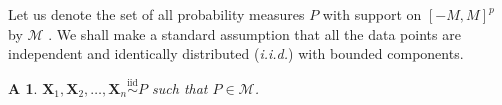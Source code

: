 \documentclass[11pt]{article}
\newcommand{\bX}{\boldsymbol{X}}
\newcommand{\bTheta}{\boldsymbol{\Theta}}
\newtheorem{assumption}{A\hspace{-4pt}}
\begin{document}








Let us denote the set of all probability measures $P$ with support on $[-M,M]^p$ by $\mathcal{M}$%
. We shall make a standard assumption that all the data points are independent and identically distributed (\textit{i.i.d.}) with bounded components.

\begin{assumption}\label{ass-1-iid}
    $\bm{X}_1,\bm{X}_2,\ldots,\bm{X}_n \overset{\text{iid}}{\sim}P$ such that $P\in \mathcal{M}$.
\end{assumption}
\end{document}
